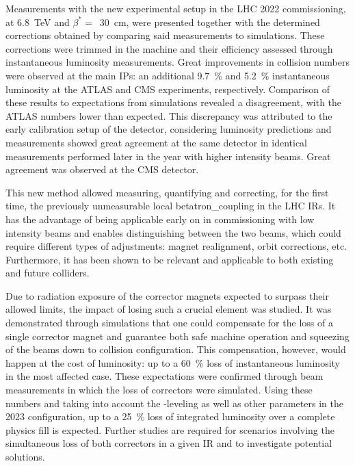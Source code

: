 Measurements with the new experimental setup in the \gls{LHC} \num{2022} commissioning, at \qty{6.8}{\tera\electronvolt} and \(\beta^{\ast} =\)~\qty{30}{\centi\meter}, were presented together with the determined corrections obtained by comparing said measurements to simulations.
These corrections were trimmed in the machine and their efficiency assessed through instantaneous \gls{luminosity} measurements.
Great improvements in collision numbers were observed at the main \glspl{IP}: an additional \qty{9.7}{\percent} and \qty{5.2}{\percent} instantaneous luminosity at the \acrshort{ATLAS} and \acrshort{CMS} \glspl{experiment}, respectively.
Comparison of these results to expectations from simulations revealed a disagreement, with the \acrshort{ATLAS} numbers lower than expected.
This discrepancy was attributed to the early calibration setup of the detector, considering luminosity predictions and measurements showed great agreement at the same detector in identical measurements performed later in the year with higher intensity beams.
Great agreement was observed at the \acrshort{CMS} detector.

This new method allowed measuring, quantifying and correcting, for the first time, the previously unmeasurable local \gls{betatron_coupling} in the \gls{LHC} \glspl{IR}.
It has the advantage of being applicable early on in commissioning with low intensity beams and enables distinguishing between the two beams, which could require different types of adjustments: magnet realignment, orbit corrections, etc.
Furthermore, it has been shown to be relevant and applicable to both existing and future colliders.

Due to radiation exposure of the corrector magnets expected to surpass their allowed limits, the impact of losing such a crucial element was studied.
It was demonstrated through simulations that one could compensate for the loss of a single corrector magnet and guarantee both safe machine operation and squeezing of the beams down to collision configuration.
This compensation, however, would happen at the cost of luminosity: up to a \qty{60}{\percent} loss of instantaneous luminosity in the most affected case.
These expectations were confirmed through beam measurements in which the loss of correctors were simulated.
Using these numbers and taking into account the -leveling as well as other parameters in the \num{2023} configuration, up to a \qty{25}{\percent} loss of integrated luminosity over a complete physics fill is expected.
Further studies are required for scenarios involving the simultaneous loss of both correctors in a given \gls{IR} and to investigate potential solutions.
\break

